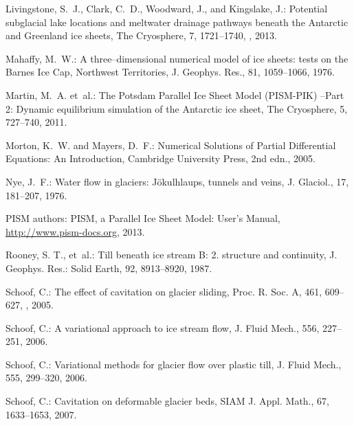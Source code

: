 \documentclass[gmd]{copernicus}   %
\begin{document}
\begin{thebibliography}{}
Livingstone, S.~J., Clark, C.~D., Woodward, J., and Kingslake, J.: Potential
  subglacial lake locations and meltwater drainage pathways beneath the
  {A}ntarctic and {G}reenland ice sheets, The Cryosphere, 7, 1721--1740,
  , 2013.

Mahaffy, M.~W.: A three--dimensional numerical model of ice sheets: tests on
  the {B}arnes {I}ce {C}ap, {N}orthwest {T}erritories, J. Geophys. Res., 81,
  1059--1066, 1976.

Martin, M.~A. et~al.: The {P}otsdam {P}arallel {I}ce {S}heet
  {M}odel ({PISM-PIK}) --{P}art 2: {D}ynamic equilibrium simulation of the
  {A}ntarctic ice sheet, The Cryosphere, 5, 727--740, 2011.

Morton, K.~W. and Mayers, D.~F.: Numerical {S}olutions of {P}artial
  {D}ifferential {E}quations: {A}n {I}ntroduction, Cambridge University Press,
  2nd edn., 2005.

Nye, J.~F.: Water flow in glaciers: {J}\"okulhlaups, tunnels and veins, J.
  Glaciol., 17, 181--207, 1976.

{PISM authors}: {PISM}, a {P}arallel {I}ce {S}heet {M}odel: {U}ser's {M}anual,
  \url{http://www.pism-docs.org}, 2013.

Rooney, S. T., et~al.: Till beneath ice stream {B}: 2. structure and continuity,
  J. Geophys. Res.: Solid Earth, 92, 8913--8920, 1987.

Schoof, C.: The effect of cavitation on glacier sliding, Proc. R. Soc. A, 461,
  609--627, , 2005.

Schoof, C.: A variational approach to ice stream flow, J. Fluid Mech., 556,
  227--251, 2006{}.

Schoof, C.: Variational methods for glacier flow over plastic till, J. Fluid
  Mech., 555, 299--320, 2006{}.

Schoof, C.: Cavitation on deformable glacier beds, SIAM J. Appl. Math., 67,
  1633--1653, 2007.


\end{thebibliography}
\end{document}

